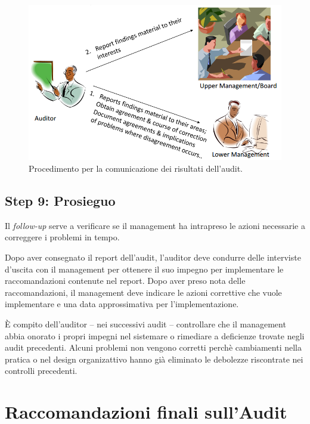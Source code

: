 \begin{figure}[h!]
  \begin{center}
    \includegraphics[scale=0.4]{res/img/communication_audit.png}
  \end{center}
  \caption{Procedimento per la comunicazione dei risultati dell'audit.}
  \label{fig:consegnarisultati}
\end{figure}

\subsection{Step 9: Prosieguo}


Il \textit{follow-up} serve a verificare se il management ha intrapreso le
azioni necessarie a correggere i problemi in tempo.

Dopo aver consegnato il report dell'audit, l'auditor deve condurre
delle interviste d'uscita con il management per ottenere il suo
impegno per implementare le raccomandazioni contenute nel report.
Dopo aver preso nota delle raccomandazioni, il management deve
indicare le azioni correttive che vuole implementare e una data
approssimativa per l'implementazione.

È compito dell'auditor -- nei successivi audit --
controllare che il management abbia onorato
i propri impegni nel sistemare o rimediare a deficienze trovate negli
audit precedenti.
Alcuni problemi non vengono corretti perchè cambiamenti nella pratica o
nel design organizattivo hanno già eliminato le debolezze riscontrate nei
controlli precedenti.

\section{Raccomandazioni finali sull'Audit}

